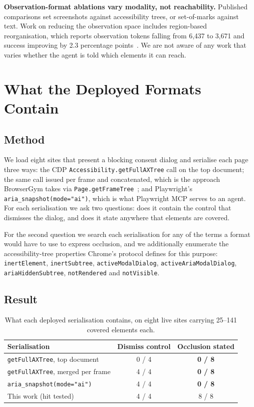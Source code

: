 \documentclass[conference]{IEEEtran}
\begin{document}
\textbf{Observation-format ablations vary modality, not reachability.}
Published comparisons set screenshots against accessibility trees, or
set-of-marks against text. Work on reducing the observation space includes
region-based reorganisation, which reports observation tokens falling from
6{,}437 to 3{,}671 and success improving by 2.3 percentage
points~\cite{region4web}. We are not aware of any work that varies whether the
agent is told which elements it can reach.

\section{What the Deployed Formats Contain}
\label{sec:audit}

\subsection{Method}

We load eight sites that present a blocking consent dialog and serialise each
page three ways: the CDP \texttt{Accessibility.getFullAXTree} call on the top
document; the same call issued per frame and concatenated, which is the
approach BrowserGym takes via \texttt{Page.getFrameTree}~\cite{browsergym}; and
Playwright's \texttt{aria\_snapshot(mode="ai")}, which is what Playwright MCP
serves to an agent. For each serialisation we ask two questions: does it
contain the control that dismisses the dialog, and does it state anywhere that
elements are covered.

For the second question we search each serialisation for any of the terms a
format would have to use to express occlusion, and we additionally enumerate
the accessibility-tree properties Chrome's protocol defines for this purpose:
\texttt{inertElement}, \texttt{inertSubtree}, \texttt{activeModalDialog},
\texttt{activeAriaModalDialog}, \texttt{ariaHiddenSubtree},
\texttt{notRendered} and \texttt{notVisible}.

\subsection{Result}

\begin{table}[t]
\caption{What each deployed serialisation contains, on eight live sites
carrying 25--141 covered elements each.}
\label{tab:audit}
\centering
\begin{tabular}{@{}lcc@{}}
\toprule
Serialisation & Dismiss control & Occlusion stated \\
\midrule
\texttt{getFullAXTree}, top document & 0 / 4 & \textbf{0 / 8} \\
\texttt{getFullAXTree}, merged per frame & 4 / 4 & \textbf{0 / 8} \\
\texttt{aria\_snapshot(mode="ai")} & 4 / 4 & \textbf{0 / 8} \\
\midrule
This work (hit tested) & 4 / 4 & 8 / 8 \\
\bottomrule
\end{tabular}
\end{table}
\end{document}

